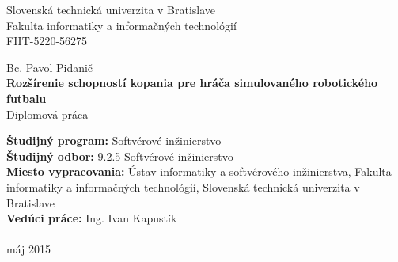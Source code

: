 
%
\begin{titlepage}
	\begin{center}
	\large Slovenská technická univerzita v Bratislave \\ \Large Fakulta informatiky a informačných technológií
	\\ \large FIIT-5220-56275
	\end{center}
	\vfill
	\begin{center}
	\Large Bc. Pavol Pidanič \\
	\LARGE \textbf{Rozšírenie schopností kopania pre hráča simulovaného robotického futbalu} \\
	\large Diplomová práca
	\end{center}
	\vfill
	\small
	\textbf{Študijný program:} Softvérové inžinierstvo \\
	\textbf{Študijný odbor:} 9.2.5 Softvérové inžinierstvo \\
	\textbf{Miesto vypracovania:} Ústav informatiky a softvérového inžinierstva, Fakulta informatiky a informačných technológií, Slovenská technická univerzita v Bratislave \\
	\textbf{Vedúci práce:} Ing. Ivan Kapustík \\\\
	máj 2015
	\normalsize
\end{titlepage}
%